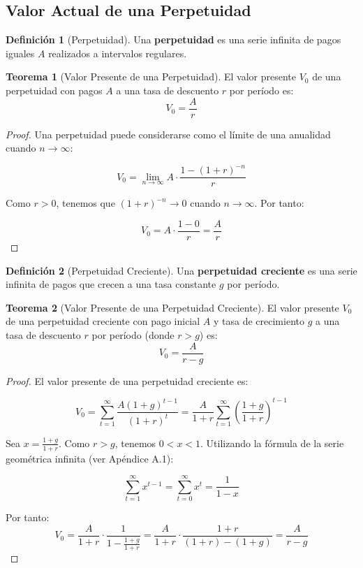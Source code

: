 \documentclass[12pt,a4paper]{article}
\theoremstyle{definition}
\newtheorem{definicion}{Definición}[section]
\newtheorem{teorema}{Teorema}[section]
\begin{document}
\subsection{Valor Actual de una Perpetuidad}

\begin{definicion}[Perpetuidad]
Una \textbf{perpetuidad} es una serie infinita de pagos iguales $A$ realizados a intervalos regulares.
\end{definicion}

\begin{teorema}[Valor Presente de una Perpetuidad]
El valor presente $V_0$ de una perpetuidad con pagos $A$ a una tasa de descuento $r$ por período es:
\begin{equation}
V_0 = \frac{A}{r}
\end{equation}
\end{teorema}

\begin{proof}
Una perpetuidad puede considerarse como el límite de una anualidad cuando $n \to \infty$:

$$V_0 = \lim_{n \to \infty} A \cdot \frac{1 - (1 + r)^{-n}}{r}$$

Como $r > 0$, tenemos que $(1 + r)^{-n} \to 0$ cuando $n \to \infty$. Por tanto:

$$V_0 = A \cdot \frac{1 - 0}{r} = \frac{A}{r}$$
\end{proof}

\begin{center}
    
\end{center}

\begin{definicion}[Perpetuidad Creciente]
Una \textbf{perpetuidad creciente} es una serie infinita de pagos que crecen a una tasa constante $g$ por período.
\end{definicion}

\begin{teorema}[Valor Presente de una Perpetuidad Creciente]
El valor presente $V_0$ de una perpetuidad creciente con pago inicial $A$ y tasa de crecimiento $g$ a una tasa de descuento $r$ por período (donde $r > g$) es:
\begin{equation}
V_0 = \frac{A}{r - g}
\end{equation}
\end{teorema}

\begin{proof}
El valor presente de una perpetuidad creciente es:

$$V_0 = \sum_{t=1}^{\infty} \frac{A(1 + g)^{t-1}}{(1 + r)^t} = \frac{A}{1 + r} \sum_{t=1}^{\infty} \left(\frac{1 + g}{1 + r}\right)^{t-1}$$

Sea $x = \frac{1 + g}{1 + r}$. Como $r > g$, tenemos $0 < x < 1$. Utilizando la fórmula de la serie geométrica infinita (ver Apéndice A.1):

$$\sum_{t=1}^{\infty} x^{t-1} = \sum_{t=0}^{\infty} x^t = \frac{1}{1 - x}$$

Por tanto:
$$V_0 = \frac{A}{1 + r} \cdot \frac{1}{1 - \frac{1 + g}{1 + r}} = \frac{A}{1 + r} \cdot \frac{1 + r}{(1 + r) - (1 + g)} = \frac{A}{r - g}$$
\end{proof}
\end{document}
